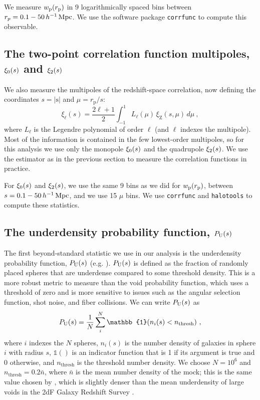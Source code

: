 We measure $w_\mathrm{p}(r_\mathrm{p})$ in 9 logarithmically spaced bins between $r_p = 0.1-50 \, h^{-1}\,\mathrm{Mpc}$.
We use the software package \texttt{corrfunc} \citep{SinhaGarrison2019, Sinha2020} to compute this observable.

\subsection{The two-point correlation function multipoles, \texorpdfstring{$\xi_0(s)$ and $\xi_2(s)$}{xi0(s) and xi2(s)}} 
\label{sec:cfs}

We also measure the multipoles of the redshift-space correlation, now defining the coordinates $s = |\bm{\mathrm{s}}|$ and $\mu = r_\mathrm{p}/s$:
\begin{equation}
\xi_{\ell}(s) = \frac{2\ell+1}{2}\int_{-1}^{1} L_{\ell}(\mu) \, \xi_\mathrm{Z}(s, \mu) \, d\mu ~,
\end{equation}
where $L_{\ell}$ is the Legendre polynomial of order $\ell$ (and $\ell$ indexes the multipole).
Most of the information is contained in the few lowest-order multipoles, so for this analysis we use only the monopole $\xi_0(s)$ and the quadrupole $\xi_2(s)$.
We use the \cite{PeeblesHauser1974} estimator as in the previous section to measure the correlation functions in practice.

For $\xi_0(s)$ and $\xi_2(s)$, we use the same 9 bins as we did for $w_\mathrm{p}(r_\mathrm{p})$, between $s = 0.1-50 \, h^{-1}\,\mathrm{Mpc}$, and we use 15 $\mu$ bins.
We use \texttt{corrfunc} \citep{SinhaGarrison2019, Sinha2020} and \texttt{halotools} \citep{Hearin2017} to compute these statistics.


\subsection{The underdensity probability function, \texorpdfstring{$P_\mathrm{U}(s)$}{P(s)}}
\label{sec:upf}

The first beyond-standard statistic we use in our analysis is the underdensity probability function, $P_\mathrm{U}(s)$ (e.g. \citealt{HoyleVogeley2004}).
$P_\mathrm{U}(s)$ is defined as the fraction of randomly placed spheres that are underdense compared to some threshold density.
This is a more robust metric to measure than the void probability function, which uses a threshold of zero and is more sensitive to issues such as the angular selection function, shot noise, and fiber collisions.
We can write $P_\mathrm{U}(s)$ as
\begin{equation}
	\upf = \frac{1}{N} \sum_i^N \mathbb{1}(n_i(s) < n_\mathrm{thresh}) ~,
\end{equation}
where $i$ indexes the $N$ spheres, $n_i(s)$ is the number density of galaxies in sphere $i$ with radius $s$, $\mathbb{1}()$ is an indicator function that is 1 if its argument is true and 0 otherwise, and $n_\mathrm{thresh}$ is the threshold number density. 
We choose $N=10^6$ and $n_\mathrm{thresh} = 0.2 \bar{n}$, where $\bar{n}$ is the mean number density of the mock; this is the same value chosen by \cite{HoyleVogeley2004}, which is slightly denser than the mean underdensity of large voids in the 2dF Galaxy Redshift Survey \citep{Colless2003}.

